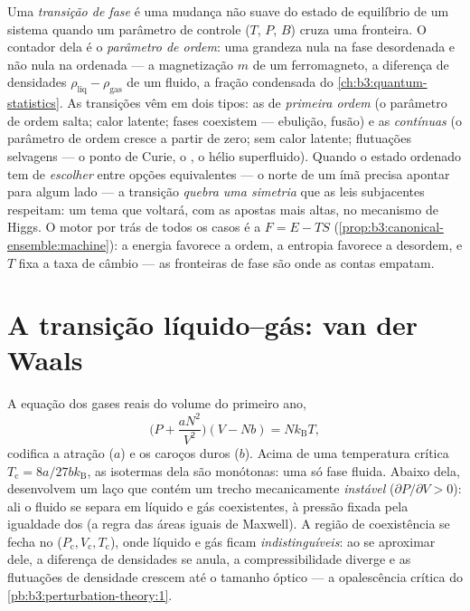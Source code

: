 \begin{definition}\label{def:b3:phase-transitions:order}
Uma \emph{transição de fase} é uma mudança não suave do estado de
equilíbrio de um sistema quando um parâmetro de controle ($T$, $P$,
$B$) cruza uma fronteira. O contador dela é o \emph{parâmetro de
ordem}: uma grandeza nula na fase desordenada e não nula na ordenada ---
a magnetização $m$ de um ferromagneto, a diferença de densidades
$\rho_{\text{liq}} - \rho_{\text{gas}}$ de um fluido, a fração
condensada do \cref{ch:b3:quantum-statistics}. As transições vêm em
dois tipos: as de \emph{primeira ordem} (o parâmetro de ordem salta;
calor latente; fases coexistem --- ebulição, fusão) e as
\emph{contínuas} (o parâmetro de ordem cresce a partir de zero; sem
calor latente; flutuações selvagens --- o ponto de Curie, o , o hélio superfluido). Quando o estado ordenado tem de
\emph{escolher} entre opções equivalentes --- o norte de um ímã precisa
apontar para algum lado --- a transição \emph{quebra uma simetria} que
as leis subjacentes respeitam: um tema que voltará, com as apostas mais
altas, no mecanismo de Higgs.
O motor por trás de todos os casos é a  $F = E - TS$
(\cref{prop:b3:canonical-ensemble:machine}): a energia favorece a
ordem, a entropia favorece a desordem, e $T$ fixa a taxa de câmbio ---
as fronteiras de fase são onde as contas empatam.
\end{definition}

\section{A transição líquido--gás: van der Waals}

\begin{proposition}\label{prop:b3:phase-transitions:vdw}
A equação dos gases reais do volume do primeiro ano,
\[
\Big(P + \frac{aN^2}{V^2}\Big)(V - Nb) = Nk_{\text{B}}T ,
\]
codifica a atração ($a$) e os caroços duros ($b$). Acima de uma
temperatura crítica $T_{\text{c}} = 8a/27bk_{\text{B}}$, as isotermas
dela são monótonas: uma só fase fluida. Abaixo dela, desenvolvem um laço
que contém um trecho mecanicamente \emph{instável} ($\partial P/\partial V >
0$): ali o fluido se separa em líquido e gás
coexistentes, à pressão fixada pela igualdade dos 
(a regra das áreas iguais de Maxwell). A região de coexistência se
fecha no  ($P_{\text{c}}, V_{\text{c}}, T_{\text{c}}$),
onde líquido e gás ficam \emph{indistinguíveis}: ao se aproximar dele,
a diferença de densidades se anula, a compressibilidade diverge e as
flutuações de densidade crescem até o tamanho óptico --- a
opalescência crítica do \cref{pb:b3:perturbation-theory:1}.
\end{proposition}
\admitted

